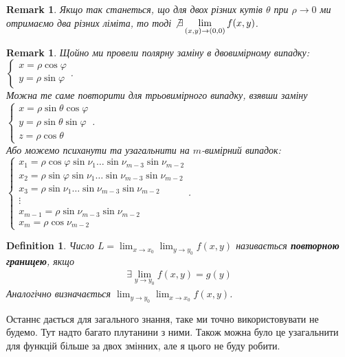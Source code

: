 \documentclass[a4paper, 10pt]{article}
\def\huge{\displaystyle}
\theoremstyle{theoremdd}
\theoremstyle{theoremdd}
\theoremstyle{theoremdd}
\newtheorem{definition}[theorem]{Definition}
\theoremstyle{theoremdd}
\theoremstyle{theoremdd}
\theoremstyle{theoremdd}
\theoremstyle{theoremdd}
\newtheorem{remark}[theorem]{Remark}
\theoremstyle{theoremdd}
\theoremstyle{theoremdd}
\begin{document}
\begin{remark}
Якщо так станеться, що для двох різних кутів $\theta$ при $\rho \to 0$ ми отримаємо два різних ліміта, то тоді $\not\exists \huge\lim_{(x,y) \to (0,0)} f(x,y)$.
\end{remark}

\begin{remark}
Щойно ми провели полярну заміну в двовимірному випадку: $\begin{cases} x = \rho \cos \varphi \\ y = \rho \sin \varphi \end{cases}$.\\
Можна те саме повторити для трьовимірного випадку, взявши заміну $\begin{cases} x = \rho \sin \theta \cos \varphi \\ y = \rho \sin \theta \sin \varphi \\ z = \rho \cos \theta \end{cases}$.\\
Або можемо психанути та узагальнити на $m$-вимірний випадок: $\begin{cases} x_1 = \rho \cos \varphi \sin \nu_1 \dots \sin \nu_{m-3} \sin \nu_{m-2} \\ x_2 = \rho \sin \varphi \sin \nu_1 \dots \sin \nu_{m-3} \sin \nu_{m-2} \\ x_3 = \rho \sin \nu_1 \dots \sin \nu_{m-3} \sin \nu_{m-2} \\ \vdots \\ x_{m-1} = \rho \sin \nu_{m-3} \sin \nu_{m-2} \\ x_m = \rho \cos \nu_{m-2} \end{cases}$.
\end{remark}

\begin{definition}
Число $L = \huge\lim_{x \to x_0} \lim_{y \to y_0} f(x,y)$ називається \textbf{повторною границею}, якщо
\begin{align*}
\exists \huge\lim_{y \to y_0} f(x,y) = g(y)
\end{align*}
Аналогічно визначається $\huge\lim_{y \to y_0} \lim_{x \to x_0} f(x,y)$.
\end{definition}
Останнє дається для загального знання, таке ми точно використовувати не будемо. Тут надто багато плутанини з ними. Також можна було це узагальнити для функцій більше за двох змінних, але я цього не буду робити.
\end{document}
